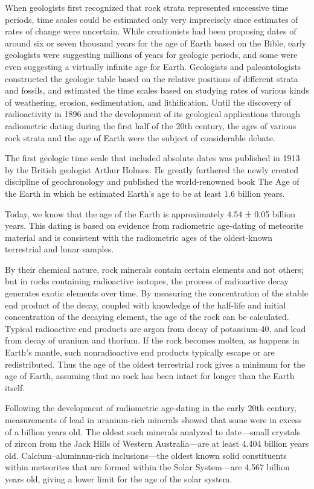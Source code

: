\documentclass[]{book}
\theoremstyle{definition}
\theoremstyle{definition}
\theoremstyle{definition}
\theoremstyle{remark}
\begin{document}
When geologists first recognized that rock strata represented successive
time periods, time scales could be estimated only very imprecisely since
estimates of rates of change were uncertain. While creationists had been
proposing dates of around six or seven thousand years for the age of
Earth based on the Bible, early geologists were suggesting millions of
years for geologic periods, and some were even suggesting a virtually
infinite age for Earth. Geologists and paleontologists constructed the
geologic table based on the relative positions of different strata and
fossils, and estimated the time scales based on studying rates of
various kinds of weathering, erosion, sedimentation, and lithification.
Until the discovery of radioactivity in 1896 and the development of its
geological applications through radiometric dating during the first half
of the 20th century, the ages of various rock strata and the age of
Earth were the subject of considerable debate.

The first geologic time scale that included absolute dates was published
in 1913 by the British geologist Arthur Holmes. He greatly furthered the
newly created discipline of geochronology and published the
world-renowned book The Age of the Earth in which he estimated Earth's
age to be at least 1.6 billion years.

Today, we know that the age of the Earth is approximately 4.54 ± 0.05
billion years. This dating is based on evidence from radiometric
age-dating of meteorite material and is consistent with the radiometric
ages of the oldest-known terrestrial and lunar samples.

By their chemical nature, rock minerals contain certain elements and not
others; but in rocks containing radioactive isotopes, the process of
radioactive decay generates exotic elements over time. By measuring the
concentration of the stable end product of the decay, coupled with
knowledge of the half-life and initial concentration of the decaying
element, the age of the rock can be calculated. Typical radioactive end
products are argon from decay of potassium-40, and lead from decay of
uranium and thorium. If the rock becomes molten, as happens in Earth's
mantle, such nonradioactive end products typically escape or are
redistributed. Thus the age of the oldest terrestrial rock gives a
minimum for the age of Earth, assuming that no rock has been intact for
longer than the Earth itself.

Following the development of radiometric age-dating in the early 20th
century, measurements of lead in uranium-rich minerals showed that some
were in excess of a billion years old. The oldest such minerals analyzed
to date---small crystals of zircon from the Jack Hills of Western
Australia---are at least 4.404 billion years old. Calcium--aluminum-rich
inclusions---the oldest known solid constituents within meteorites that
are formed within the Solar System---are 4.567 billion years old, giving
a lower limit for the age of the solar system.
\end{document}
